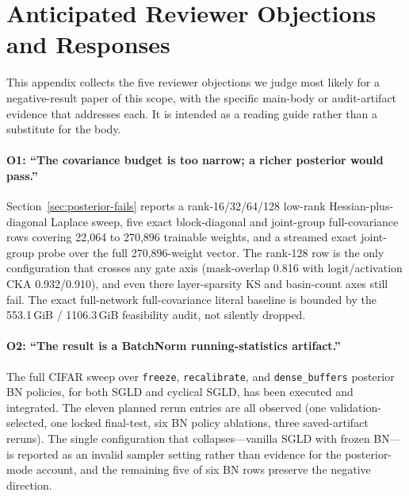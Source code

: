 \documentclass{article}
\newif\iflotteryiclr
\newif\iflotteryincludeappendix
\begin{document}
\iflotteryiclr
  \section*{LLM Usage Disclosure}

  LLM-based coding and writing assistants were used to help draft audit and
  runbook scripts, generate reproducibility and submission-checklist
  documentation, search for stale claims and missing evidence, and propose
  edits to code comments and manuscript wording. They were not used as authors
  and were not treated as sources of scientific evidence. All experimental
  results were produced by the repository code and saved artifacts, and all
  claims, references, code changes, and final manuscript text were reviewed and
  accepted by the human authors.
\fi

\iflotteryincludeappendix
  \clearpage
  \appendix
  \section{Anticipated Reviewer Objections and Responses}
  \label{sec:reviewer-defense}

  This appendix collects the five reviewer objections we judge most likely
  for a negative-result paper of this scope, with the specific main-body or
  audit-artifact evidence that addresses each. It is intended as a reading
  guide rather than a substitute for the body.

  \paragraph{O1: ``The covariance budget is too narrow; a richer posterior
  would pass.''}
  Section~\ref{sec:posterior-fails} reports a rank-16/32/64/128 low-rank
  Hessian-plus-diagonal Laplace sweep, five exact block-diagonal and
  joint-group full-covariance rows covering 22{,}064 to 270{,}896 trainable
  weights, and a streamed exact joint-group probe over the full
  270{,}896-weight vector. The rank-128 row is the only configuration that
  crosses any gate axis (mask-overlap 0.816 with logit/activation CKA
  0.932/0.910), and even there layer-sparsity KS and basin-count axes still
  fail. The exact full-network full-covariance literal baseline is bounded
  by the 553.1\,GiB / 1106.3\,GiB feasibility audit, not silently dropped.

  \paragraph{O2: ``The result is a BatchNorm running-statistics artifact.''}
  The full CIFAR sweep over \texttt{freeze}, \texttt{recalibrate}, and
  \texttt{dense\_buffers} posterior BN policies, for both SGLD and cyclical
  SGLD, has been executed and integrated. The eleven planned rerun entries
  are all observed (one validation-selected, one locked final-test, six BN
  policy ablations, three saved-artifact reruns). The single configuration
  that collapses---vanilla SGLD with frozen BN---is reported as an invalid
  sampler setting rather than evidence for the posterior-mode account, and
  the remaining five of six BN rows preserve the negative direction.
\end{document}
